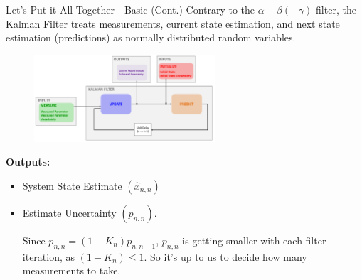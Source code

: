 \begin{frame}{Let's Put it All Together - Basic (Cont.)}
Contrary to the $\alpha - \beta (- \gamma)$ filter, the Kalman Filter treats measurements, current state estimation, and next state estimation (predictions) as normally distributed random variables.
        \begin{figure}
		   \centering
		   \includegraphics[width=0.6\textwidth]{Figures/Chapter1/KalmanFilterAlgorithm.png}
		   \label{fig:PDFs}
	    \end{figure}
	\textbf{Outputs:}
	\begin{itemize}
       \item System State Estimate $(\hat{x}_{n,n})$
       \item Estimate Uncertainty $(p_{n,n})$. 
       
       Since $p_{n,n} = (1-K_n)p_{n,n-1}$, $p_{n,n}$ is getting smaller with each filter iteration, as $(1-K_n)\leq1$. So it's up to us to decide how many measurements to take.
	\end{itemize}
\end{frame}


